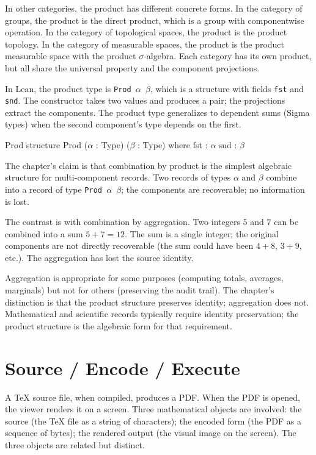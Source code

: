 In other categories, the product has different concrete forms. In
the category of groups, the product is the direct product, which
is a group with componentwise operation. In the category of
topological spaces, the product is the product topology. In the
category of measurable spaces, the product is the product
measurable space with the product $\sigma$-algebra. Each category
has its own product, but all share the universal property and the
component projections.

In Lean, the product type is \texttt{Prod $\alpha$ $\beta$}, which
is a structure with fields \texttt{fst} and \texttt{snd}. The
constructor takes two values and produces a pair; the projections
extract the components. The product type generalizes to dependent
sums (Sigma types) when the second component's type depends on
the first.

\begin{leanexcerpt}{Prod}
structure Prod ($\alpha$ : Type) ($\beta$ : Type) where
  fst : $\alpha$
  snd : $\beta$
\end{leanexcerpt}

The chapter's claim is that combination by product is the simplest
algebraic structure for multi-component records. Two records of
types $\alpha$ and $\beta$ combine into a record of type
\texttt{Prod $\alpha$ $\beta$}; the components are recoverable;
no information is lost.

The contrast is with combination by aggregation. Two integers
$5$ and $7$ can be combined into a sum $5 + 7 = 12$. The sum is
a single integer; the original components are not directly
recoverable (the sum could have been $4 + 8$, $3 + 9$, etc.).
The aggregation has lost the source identity.

Aggregation is appropriate for some purposes (computing totals,
averages, marginals) but not for others (preserving the audit
trail). The chapter's distinction is that the product structure
preserves identity; aggregation does not. Mathematical and
scientific records typically require identity preservation; the
product structure is the algebraic form for that requirement.

\section{Source / Encode / Execute}
\label{se:source-encode-execute}

A TeX source file, when compiled, produces a PDF. When the PDF is
opened, the viewer renders it on a screen. Three mathematical objects
are involved: the source (the TeX file as a string of characters); the
encoded form (the PDF as a sequence of bytes); the rendered output
(the visual image on the screen). The three objects are related but
distinct.

